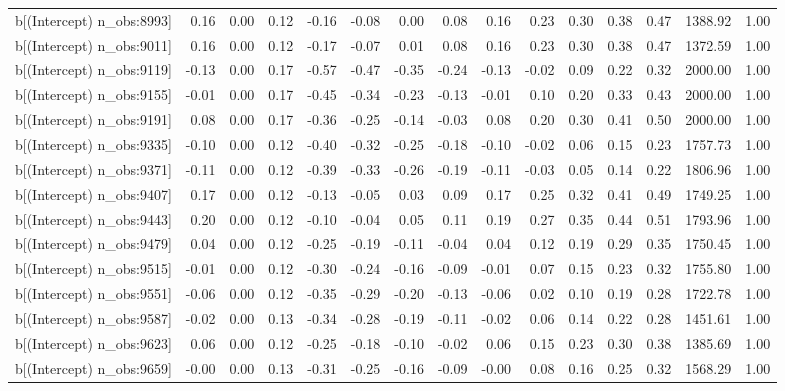 \begin{table}[ht]
\begin{tabular}{rrrrrrrrrrrrrrr}
  b[(Intercept) n\_obs:8993] & 0.16 & 0.00 & 0.12 & -0.16 & -0.08 & 0.00 & 0.08 & 0.16 & 0.23 & 0.30 & 0.38 & 0.47 & 1388.92 & 1.00 \\ 
  b[(Intercept) n\_obs:9011] & 0.16 & 0.00 & 0.12 & -0.17 & -0.07 & 0.01 & 0.08 & 0.16 & 0.23 & 0.30 & 0.38 & 0.47 & 1372.59 & 1.00 \\ 
  b[(Intercept) n\_obs:9119] & -0.13 & 0.00 & 0.17 & -0.57 & -0.47 & -0.35 & -0.24 & -0.13 & -0.02 & 0.09 & 0.22 & 0.32 & 2000.00 & 1.00 \\ 
  b[(Intercept) n\_obs:9155] & -0.01 & 0.00 & 0.17 & -0.45 & -0.34 & -0.23 & -0.13 & -0.01 & 0.10 & 0.20 & 0.33 & 0.43 & 2000.00 & 1.00 \\ 
  b[(Intercept) n\_obs:9191] & 0.08 & 0.00 & 0.17 & -0.36 & -0.25 & -0.14 & -0.03 & 0.08 & 0.20 & 0.30 & 0.41 & 0.50 & 2000.00 & 1.00 \\ 
  b[(Intercept) n\_obs:9335] & -0.10 & 0.00 & 0.12 & -0.40 & -0.32 & -0.25 & -0.18 & -0.10 & -0.02 & 0.06 & 0.15 & 0.23 & 1757.73 & 1.00 \\ 
  b[(Intercept) n\_obs:9371] & -0.11 & 0.00 & 0.12 & -0.39 & -0.33 & -0.26 & -0.19 & -0.11 & -0.03 & 0.05 & 0.14 & 0.22 & 1806.96 & 1.00 \\ 
  b[(Intercept) n\_obs:9407] & 0.17 & 0.00 & 0.12 & -0.13 & -0.05 & 0.03 & 0.09 & 0.17 & 0.25 & 0.32 & 0.41 & 0.49 & 1749.25 & 1.00 \\ 
  b[(Intercept) n\_obs:9443] & 0.20 & 0.00 & 0.12 & -0.10 & -0.04 & 0.05 & 0.11 & 0.19 & 0.27 & 0.35 & 0.44 & 0.51 & 1793.96 & 1.00 \\ 
  b[(Intercept) n\_obs:9479] & 0.04 & 0.00 & 0.12 & -0.25 & -0.19 & -0.11 & -0.04 & 0.04 & 0.12 & 0.19 & 0.29 & 0.35 & 1750.45 & 1.00 \\ 
  b[(Intercept) n\_obs:9515] & -0.01 & 0.00 & 0.12 & -0.30 & -0.24 & -0.16 & -0.09 & -0.01 & 0.07 & 0.15 & 0.23 & 0.32 & 1755.80 & 1.00 \\ 
  b[(Intercept) n\_obs:9551] & -0.06 & 0.00 & 0.12 & -0.35 & -0.29 & -0.20 & -0.13 & -0.06 & 0.02 & 0.10 & 0.19 & 0.28 & 1722.78 & 1.00 \\ 
  b[(Intercept) n\_obs:9587] & -0.02 & 0.00 & 0.13 & -0.34 & -0.28 & -0.19 & -0.11 & -0.02 & 0.06 & 0.14 & 0.22 & 0.28 & 1451.61 & 1.00 \\ 
  b[(Intercept) n\_obs:9623] & 0.06 & 0.00 & 0.12 & -0.25 & -0.18 & -0.10 & -0.02 & 0.06 & 0.15 & 0.23 & 0.30 & 0.38 & 1385.69 & 1.00 \\ 
  b[(Intercept) n\_obs:9659] & -0.00 & 0.00 & 0.13 & -0.31 & -0.25 & -0.16 & -0.09 & -0.00 & 0.08 & 0.16 & 0.25 & 0.32 & 1568.29 & 1.00 \\ 

\end{tabular}
\end{table}
